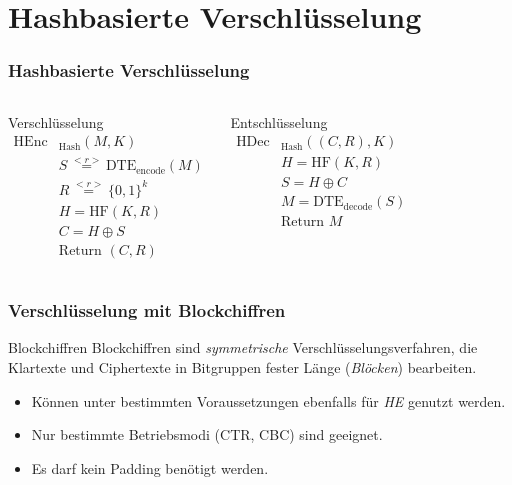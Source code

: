 \section{Hashbasierte Verschlüsselung}

\begin{frame}[c]
	\frametitle{Hashbasierte Verschlüsselung}
	
	\begin{columns}
		Verschlüsselung
		\begin{align*}
			\text{HEnc}&_{\text{Hash}}(M, K)\\
			&S \overset{<r>}{=} \text{DTE}_{\text{encode}}(M)\\ 	%
			&R \overset{<r>}{=} \{0,1\}^k\\	%
			&H = \text{HF}(K,R)\\	%
			&C = H \oplus S\\	%
			&\text{Return } (C,R)
		\end{align*}
		
		\pause

		Entschlüsselung
		\begin{align*}
			\text{HDec}&_{\text{Hash}}((C,R), K)\\
			&H = \text{HF}(K,R)\\	%
			&S = H \oplus C\\	%
			&M = \text{DTE}_{\text{decode}}(S)\\ 	%
			&\text{Return } M
		\end{align*}
	\end{columns}
\end{frame}

\begin{frame}
	\frametitle{Verschlüsselung mit Blockchiffren}

	\begin{block}{Blockchiffren}
		Blockchiffren sind \emph{symmetrische} Verschlüsselungsverfahren, die Klartexte und Ciphertexte in Bitgruppen fester Länge (\emph{Blöcken}) bearbeiten.
	\end{block}

	\pause

	\begin{itemize}
		\item Können unter bestimmten Voraussetzungen ebenfalls für \emph{HE} genutzt werden.
		\item Nur bestimmte Betriebsmodi (CTR, CBC) sind geeignet.
		\item Es darf kein Padding benötigt werden.
	\end{itemize}

\end{frame}